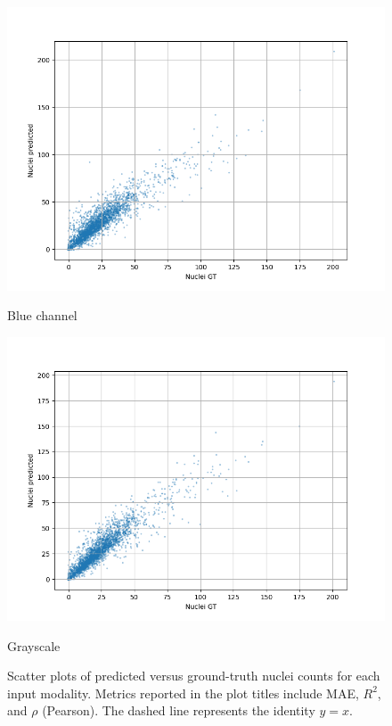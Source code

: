 \documentclass[target=bach,aauheader=,style=]{thud}
\begin{document}
\begin{figure}[ht]
\begin{minipage}{0.45\textwidth}
    \centering
    \includegraphics[width=\linewidth]{imgs/diffusion_graph_blu.png}
    \caption*{Blue channel}
\end{minipage}
\hspace{0.5cm}
\begin{minipage}{0.45\textwidth}
    \centering
    \includegraphics[width=\linewidth]{imgs/Diffusion_graph_gray.png}
    \caption*{Grayscale}
\end{minipage}

\caption{Scatter plots of predicted versus ground-truth nuclei counts for each input modality. Metrics reported in the plot titles include MAE, $R^2$, and $\rho$ (Pearson). The dashed line represents the identity $y=x$.}
\label{fig:scatter_counts}
\end{figure}
\end{document}
